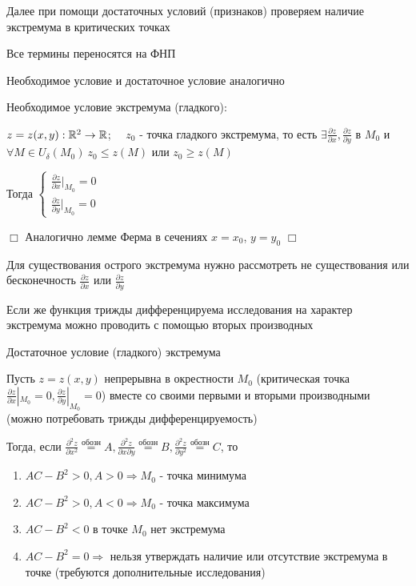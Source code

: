 \documentclass[12pt]{article}
\begin{document}
    Далее при помощи достаточных условий (признаков) проверяем наличие экстремума в критических точках

    \Nota Все термины переносятся на ФНП

    Необходимое условие и достаточное условие аналогично

    \hypertarget{extremumnecessarycondition}{}

    \Th Необходимое условие экстремума (гладкого):

    $z = z(x, y) : \mathbb{R}^2 \rightarrow \mathbb{R}$; $\quad z_0$ - точка гладкого экстремума,
    то есть $\exists \frac{\partial z}{\partial x}, \frac{\partial z}{\partial y}$ в $M_0$ и $\forall M \in U_\delta(M_0) \ z_0 \leq z(M)$ или $z_0 \geq z(M)$

    Тогда $\begin{cases}\frac{\partial z}{\partial x} |_{M_0} = 0 \\ \frac{\partial z}{\partial y} |_{M_0} = 0\end{cases}$

    $\Box$ Аналогично лемме Ферма в сечениях $x = x_0$, $y = y_0$ $\Box$

    Для существования острого экстремума нужно рассмотреть не существования или бесконечность $\frac{\partial z}{\partial x}$ или $\frac{\partial z}{\partial y}$

    Если же функция трижды дифференцируема исследования на характер экстремума можно проводить с помощью вторых производных

    \hypertarget{extremumsufficientcondition}{}

    \Th Достаточное условие (гладкого) экстремума

    Пусть $z = z(x, y)$ непрерывна в окрестности $M_0$ (критическая точка $\frac{\partial z}{\partial x} |_{M_0} = 0, \frac{\partial z}{\partial y} |_{M_0} = 0$)
    вместе со своими первыми и вторыми производными (можно потребовать трижды дифференцируемость)

    Тогда, если $\frac{\partial^2 z}{\partial x^2} \stackrel{\text{обозн}}{=} A, \frac{\partial^2 z}{\partial x \partial y} \stackrel{\text{обозн}}{=} B, \frac{\partial^2 z}{\partial y^2} \stackrel{\text{обозн}}{=} C$, то

    \begin{enumerate}
        \item $AC - B^2 > 0, A > 0 \Longrightarrow M_0$ - точка минимума
        \item $AC - B^2 > 0, A < 0 \Longrightarrow M_0$ - точка максимума
        \item $AC - B^2 < 0$ в точке $M_0$ нет экстремума
        \item $AC - B^2 = 0\Longrightarrow$ нельзя утверждать наличие или отсутствие экстремума в точке (требуются дополнительные исследования)
    \end{enumerate}
\end{document}

